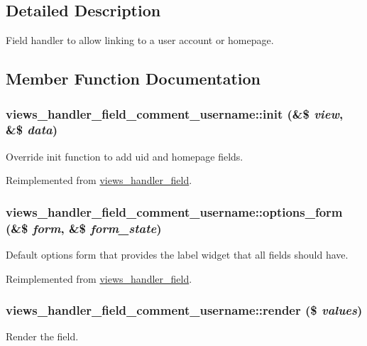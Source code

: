 \subsection{Detailed Description}
Field handler to allow linking to a user account or homepage. 

\subsection{Member Function Documentation}
\hypertarget{classviews__handler__field__comment__username_a675e72d8f097a5d645459fab6943bac6}{
\subsubsection[{init}]{\setlength{\rightskip}{0pt plus 5cm}views\_\-handler\_\-field\_\-comment\_\-username::init (\&\$ {\em view}, \/  \&\$ {\em data})}}
\label{classviews__handler__field__comment__username_a675e72d8f097a5d645459fab6943bac6}
Override init function to add uid and homepage fields. 

Reimplemented from \hyperlink{classviews__handler__field_a3a290c7df3ead81e5cd244ad5335b1cc}{views\_\-handler\_\-field}.\hypertarget{classviews__handler__field__comment__username_a9bcc4bbe9ebbd7247431cfc18c5bab9c}{
\subsubsection[{options\_\-form}]{\setlength{\rightskip}{0pt plus 5cm}views\_\-handler\_\-field\_\-comment\_\-username::options\_\-form (\&\$ {\em form}, \/  \&\$ {\em form\_\-state})}}
\label{classviews__handler__field__comment__username_a9bcc4bbe9ebbd7247431cfc18c5bab9c}
Default options form that provides the label widget that all fields should have. 

Reimplemented from \hyperlink{classviews__handler__field_a0435d161922b7b4b84f02a2e79bb947a}{views\_\-handler\_\-field}.\hypertarget{classviews__handler__field__comment__username_acbef770bc32e839510f616413fd83493}{
\subsubsection[{render}]{\setlength{\rightskip}{0pt plus 5cm}views\_\-handler\_\-field\_\-comment\_\-username::render (\$ {\em values})}}
\label{classviews__handler__field__comment__username_acbef770bc32e839510f616413fd83493}
Render the field.


